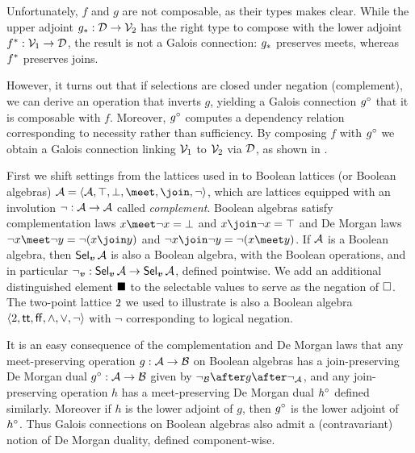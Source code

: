 

\noindent Unfortunately, $f$ and $g$ are not composable, as their types makes clear. While the upper adjoint ${g}_*: \mathcal{D} \to \mathcal{V}_2$ has the right type to compose with the lower adjoint ${f}^*: \mathcal{V}_1 \to \mathcal{D}$, the result is not a Galois connection: ${g}_*$ preserves meets, whereas ${f}^*$ preserves joins.

However, it turns out that if selections are closed under negation (complement), we can derive an operation that inverts $g$, yielding a Galois connection ${g}^{\circ}$ that it is composable with $f$. Moreover, ${g}^{\circ}$ computes a dependency relation corresponding to necessity rather than sufficiency. By composing $f$ with ${g}^{\circ}$ we obtain a Galois connection linking $\mathcal{V}_1$ to $\mathcal{V}_2$ via $\mathcal{D}$, as shown in .

First we shift settings from the lattices used in  to Boolean lattices (or Boolean algebras) $\Ann{A}= \BoolLattice{\Ann{A}}{\top}{\bot}{\meet}{\join}{\neg}$, which are lattices equipped with an involution $\neg: \mathcal{A} \to \mathcal{A}$ called \emph{complement}. Boolean algebras satisfy complementation laws $x \meet \neg x = \bot$ and $x \join \neg x = \top$ and De Morgan laws $\neg x \meet \neg y = \neg(x \join y)$ and $\neg x \join \neg y = \neg(x \meet y)$. If $\mathcal{A}$ is a Boolean algebra, then $\textup{\textsf{Sel}}_{\bm{v}}\,{\mathcal{A}}$ is also a Boolean algebra, with the Boolean operations, and in particular $\neg_{\bm{v}}: \textup{\textsf{Sel}}_{\bm{v}}\,{\mathcal{A}} \to \textup{\textsf{Sel}}_{\bm{v}}\,{\mathcal{A}}$, defined pointwise. We add an additional distinguished element $\blacksquare$ to the selectable values to serve as the negation of $\square$. The two-point lattice $2$ we used to illustrate  is also a Boolean algebra $\langle2,\mathsf{tt},\mathsf{ff},\wedge,\vee,\neg\rangle$ with $\neg$ corresponding to logical negation.



It is an easy consequence of the complementation and De Morgan laws that any meet-preserving operation $g: \mathcal{A} \to \mathcal{B}$ on Boolean algebras has a join-preserving De Morgan dual ${g}^{\circ}: \mathcal{A} \to \mathcal{B}$ given by $\neg_{\Ann{B}} \after g\after \neg_{\Ann{A}}$, and any join-preserving operation $h$ has a meet-preserving De Morgan dual ${h}^{\circ}$ defined similarly. Moreover if $h$ is the lower adjoint of $g$, then ${g}^{\circ}$ is the lower adjoint of ${h}^{\circ}$. Thus Galois connections on Boolean algebras also admit a (contravariant) notion of De Morgan duality, defined component-wise.

